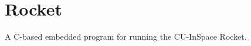 \sectionfont{\fontsize{14}{14}\selectfont}
\section{Rocket}

A C-based embedded program for running the CU-InSpace Rocket.



